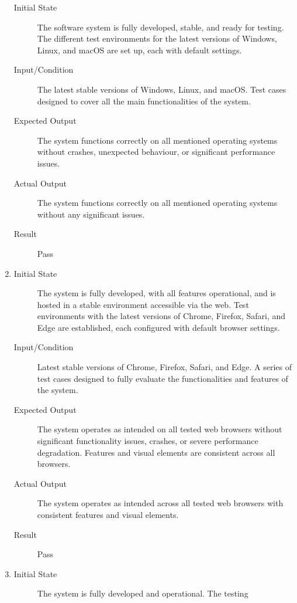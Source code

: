 \documentclass[12pt, titlepage]{article}
\begin{document}
\begin{enumerate}[NFR-T1]
    \begin{description}
    \item[Initial State] The software system is fully developed, stable, and ready
      for testing. The different test environments for the latest versions of
      Windows, Linux, and macOS are set up, each with default settings.
    \item[Input/Condition] The latest stable versions of Windows, Linux, and
      macOS. Test cases designed to cover all the main functionalities of the
      system.
    \item[Expected Output] The system functions correctly on all mentioned
      operating systems without crashes, unexpected behaviour, or significant
      performance issues.
    \item[Actual Output] The system functions correctly on all mentioned operating
      systems without any significant issues.
    \item[Result] Pass
    \end{description}
  \item \label{NFRT17}
    \begin{description}
    \item[Initial State] The system is fully developed, with all features
      operational, and is hosted in a stable environment accessible via the web.
      Test environments with the latest versions of Chrome, Firefox, Safari, and
      Edge are established, each configured with default browser settings.
    \item[Input/Condition] Latest stable versions of Chrome, Firefox, Safari, and
      Edge. A series of test cases designed to fully evaluate the
      functionalities and features of the system.
    \item[Expected Output] The system operates as intended on all tested web
      browsers without significant functionality issues, crashes, or severe
      performance degradation. Features and visual elements are consistent across
      all browsers.
    \item[Actual Output] The system operates as intended across all tested web
      browsers with consistent features and visual elements.
    \item[Result] Pass
    \end{description}
  \item \label{NFRT18}
    \begin{description}
    \item[Initial State] The system is fully developed and operational. The testing

\end{description}
\end{enumerate}
\end{document}
